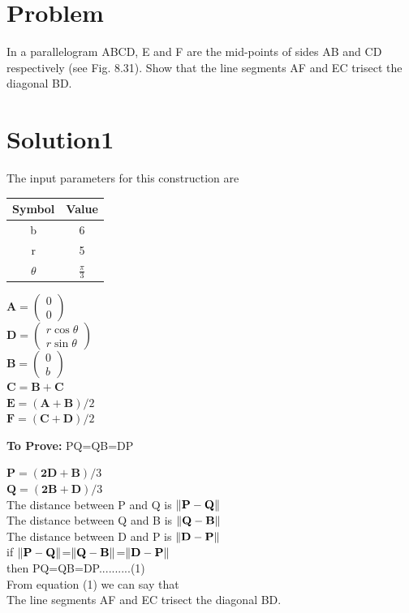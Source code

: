 \documentclass[10pt, a4paper]{article}
\title{\mytitle}
\author{\myauthor\hspace{1em}\\\contact\\FWC22012\hspace{6.5em}IITH\hspace{0.5em}\mymodule\hspace{6em}ASSIGN-5}
\date{}
\newcommand{\myvec}[1]{\ensuremath{\begin{pmatrix}#1\end{pmatrix}}}
\let\vec\mathbf
\begin{document}
	\maketitle
	\tableofcontents
   \section{Problem}
 In a parallelogram ABCD, E and F are the
mid-points of sides AB and CD respectively
(see Fig. 8.31). Show that the line segments AF
and EC trisect the diagonal BD.

   \section{Solution1}

The input parameters for this construction are 
\begin{center}
\begin{tabular}{|c|c|}
	\hline
	\textbf{Symbol}&\textbf{Value}\\
	\hline
	b&6\\
	\hline
	r&5\\
	\hline
	$\theta$&$\frac{\pi}{3}$\\
	\hline
\end{tabular}
\begin{center}
$\vec{A}=\myvec{0\\0}$\\
$\vec{D}=\myvec{r\cos\theta \\ r\sin\theta}$\\
$\vec{B}=\myvec{0\\b}$\\
$\vec{C} = \vec{B}+\vec{C}$\\
$\vec{E}=(\vec{A}+\vec{B})/2$\\
$\vec{F}=(\vec{C}+\vec{D})/2$\\
\end{center}
\end{center}
\textbf{To Prove:} PQ=QB=DP
		\begin{center}
		$\vec{P}=(\vec{2D}+\vec{B})/3$\\
$\vec{Q}=(\vec{2B}+\vec{D})/3$\\
		The distance between P and Q is $\norm{\vec{P}-\vec{Q}}$\\
		The distance between Q and B is $\norm{\vec{Q}-\vec{B}}$\\
		The distance between D and P is $\norm{\vec{D}-\vec{P}}$\\
		if $\norm{\vec{P}-\vec{Q}}$=$\norm{\vec{Q}-\vec{B}}$=$\norm{\vec{D}-\vec{P}}$\\
		then PQ=QB=DP..........(1)\\
		From equation (1) we can say that\\
		 The line segments AF and EC trisect the diagonal BD.\\
		\end{center}
\end{document}
